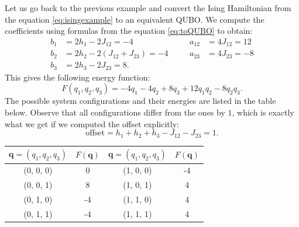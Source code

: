 \begin{example}
  Let us go back to the previous example and convert the Ising Hamiltonian from the equation \eqref{eq:isingexample}
  to an equivalent QUBO. We compute the coefficients using formulas from the equation \eqref{eq:toQUBO} to obtain:
  \begin{equation}
    \begin{alignedat}{6}
      b_{1} &= 2h_{1} - 2 J_{12} = -4            &\quad & a_{12} &= 4J_{12}=12\\
      b_{2} &= 2h_{2} - 2(J_{12} + J_{23}) = -4 &\quad & a_{23} &= 4J_{23}=-8\\
      b_{3} &= 2h_{3} - 2J_{23} = 8.             & & &
    \end{alignedat}
  \end{equation}
  This gives the following energy function:
  \begin{equation}
    F(q_{1}, q_{2}, q_{3}) = -4q_{1} -4q_{2}+8q_{3}+12q_{1}q_{2}-8q_{2}q_{3}.
  \end{equation}
  The possible system configurations and their energies are listed in the table
  below. Observe that all configurations differ from the ones by $1$, which is
  exactly what we get if we computed the offset explicitly:
  \begin{equation}
    \mbox{offset} = h_{1} + h_{2} + h_{3} - J_{12} - J_{23} = 1.
  \end{equation}

  \begin{table}[ht!]
    \begin{center}
      \begin{tabular}{|c|c||c|c|}
        \hline
        $\mathbf{q}=(q_1, q_2, q_3)$ &
        $F(\mathbf{q})$              &
        $\mathbf{q}=(q_1, q_2, q_3)$ &
        $F(\mathbf{q})$                                    \\\hline
        (0, 0, 0)                    & 0  & (1, 0, 0) & -4 \\ \hline
        (0, 0, 1)                    & 8  & (1, 0, 1) & 4  \\ \hline
        (0, 1, 0)                    & -4 & (1, 1, 0) & 4  \\ \hline
        (0, 1, 1)                    & -4 & (1, 1, 1) & 4  \\ \hline
      \end{tabular}
    \end{center}
  \end{table}

\end{example}

